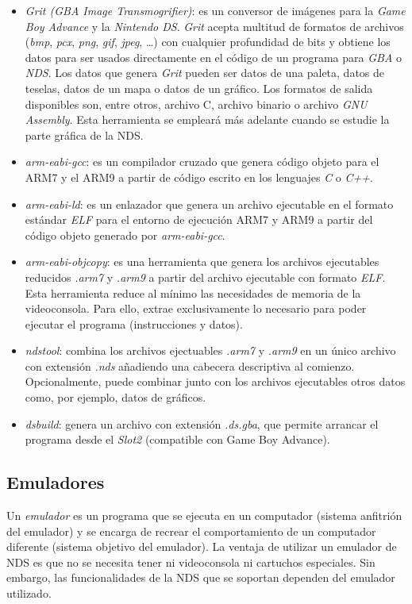 \begin{itemize}
\item \textit{Grit (GBA Image Transmogrifier)}: es un conversor de imágenes para la \textit{Game Boy Advance} y la \textit{Nintendo DS}. \textit{Grit} acepta multitud de formatos de archivos (\textit{bmp}, \textit{pcx}, \textit{png}, \textit{gif}, \textit{jpeg}, \ldots) con cualquier profundidad de bits y obtiene los datos para
ser usados directamente en el código de un programa para \textit{GBA} o \textit{NDS}. Los datos que genera \textit{Grit} pueden ser datos de una paleta, datos de teselas, datos de un mapa o datos de un gráfico. Los formatos de salida disponibles son, entre otros, archivo C, archivo binario o archivo \textit{GNU Assembly}. Esta herramienta se empleará más adelante cuando se estudie la parte gráfica de la NDS.
%
\item \textit{arm-eabi-gcc}: es un compilador cruzado que genera código objeto para el ARM7 y el ARM9 a partir de código escrito en los lenguajes \textit{C} o \textit{C++}.
%
\item \textit{arm-eabi-ld}: es un enlazador que genera un archivo ejecutable en el formato estándar
\textit{ELF} para el entorno de ejecución ARM7 y ARM9 a partir del código objeto generado por \textit{arm-eabi-gcc}.
%
\item \textit{arm-eabi-objcopy}: es una herramienta que genera los archivos ejecutables reducidos \textit{.arm7} y \textit{.arm9} a partir del archivo ejecutable con formato \textit{ELF}. Esta herramienta reduce al mínimo las necesidades de memoria de la videoconsola. Para ello, extrae exclusivamente lo necesario para poder ejecutar el programa (instrucciones y datos). 
%
\item \textit{ndstool}: combina los archivos ejectuables \textit{.arm7} y \textit{.arm9} en un único archivo con extensión \textit{.nds} añadiendo una cabecera descriptiva al comienzo. Opcionalmente, puede combinar junto con los archivos ejecutables otros datos como, por ejemplo, datos de gráficos.
%
\item \textit{dsbuild}: genera un archivo con extensión \textit{.ds.gba}, que permite arrancar el programa desde el \textit{Slot2} (compatible con Game Boy Advance).
\end{itemize}

\subsection{Emuladores}
Un \textit{emulador} es un programa que se ejecuta en un computador (sistema anfitrión del emulador) y se encarga de recrear el comportamiento de un computador diferente (sistema objetivo del emulador). La ventaja de utilizar un emulador de NDS es que no se necesita tener ni videoconsola ni cartuchos especiales. Sin embargo, las funcionalidades de la NDS que se soportan dependen del emulador utilizado. 

